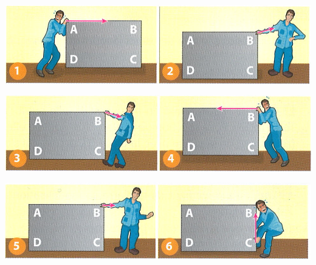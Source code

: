 \documentclass[a4paper,11pt]{exam}
\begin{document}
\begin{center}
	\includegraphics[scale=0.5]{forces_1}
	
	\vspace*{0.5cm}
	
	\includegraphics[scale=0.5]{forces_2}

	\vspace*{0.5cm}
	
	\includegraphics[scale=0.5]{forces3}
\end{center}


\label{LastPage}
\end{document}
